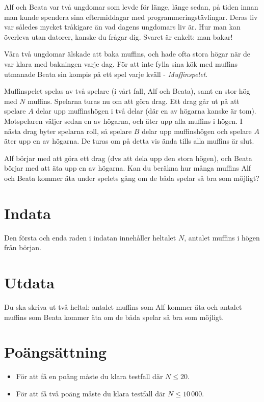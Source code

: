 
Alf och Beata var två ungdomar som levde för länge, länge sedan, på tiden innan man kunde spendera sina eftermiddagar med programmeringstävlingar. Deras liv var således mycket tråkigare än vad dagens ungdomars liv är. Hur man kan överleva utan datorer, kanske du frågar dig. Svaret är enkelt: man bakar!

Våra två ungdomar älskade att baka muffins, och hade ofta stora högar när de var klara med bakningen varje dag. För att inte fylla sina kök med muffins utmanade Beata sin kompis på ett spel varje kväll - \emph{Muffinspelet}.

Muffinspelet spelas av två spelare (i vårt fall, Alf och Beata), samt en stor hög med $N$ muffins. Spelarna turas nu om att göra drag. Ett drag går ut på att spelare $A$ delar upp muffinshögen i två delar (där en av högarna kanske är tom). Motspelaren väljer sedan en av högarna, och äter upp alla muffins i högen. I nästa drag byter spelarna roll, så spelare $B$ delar upp muffinshögen och spelare $A$ äter upp en av högarna. De turas om på detta vis ända tills alla muffins är slut.

Alf börjar med att göra ett drag (dvs att dela upp den stora högen), och Beata börjar med att äta upp en av högarna. Kan du beräkna hur många muffins Alf och Beata kommer äta under spelets gång om de båda spelar så bra som möjligt?

\section*{Indata}
Den första och enda raden i indatan innehåller heltalet $N$, antalet muffins i högen från början.

\section*{Utdata}
Du ska skriva ut två heltal: antalet muffins som Alf kommer äta och antalet muffins som Beata kommer äta om de båda spelar så bra som möjligt.

\section*{Poängsättning}
\begin{itemize}
	\item För att få en poäng måste du klara testfall där $N \le 20$.
	\item För att få två poäng måste du klara testfall där $N \le 10\,000$.
\end{itemize}


